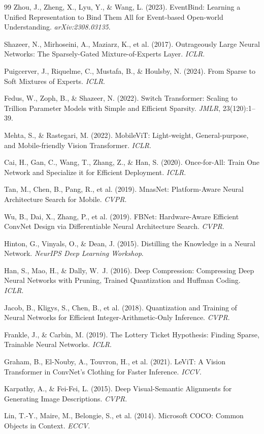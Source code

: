 \documentclass{article}
\begin{document}
{\begin{thebibliography}{99}
Zhou, J., Zheng, X., Lyu, Y., \& Wang, L. (2023). EventBind: Learning a Unified Representation to Bind Them All for Event-based Open-world Understanding. \emph{arXiv:2308.03135}.

Shazeer, N., Mirhoseini, A., Maziarz, K., et al. (2017). Outrageously Large Neural Networks: The Sparsely-Gated Mixture-of-Experts Layer. \emph{ICLR}.

Puigcerver, J., Riquelme, C., Mustafa, B., \& Houlsby, N. (2024). From Sparse to Soft Mixtures of Experts. \emph{ICLR}.

Fedus, W., Zoph, B., \& Shazeer, N. (2022). Switch Transformer: Scaling to Trillion Parameter Models with Simple and Efficient Sparsity. \emph{JMLR}, 23(120):1--39.

Mehta, S., \& Rastegari, M. (2022). MobileViT: Light-weight, General-purpose, and Mobile-friendly Vision Transformer. \emph{ICLR}.

Cai, H., Gan, C., Wang, T., Zhang, Z., \& Han, S. (2020). Once-for-All: Train One Network and Specialize it for Efficient Deployment. \emph{ICLR}.

Tan, M., Chen, B., Pang, R., et al. (2019). MnasNet: Platform-Aware Neural Architecture Search for Mobile. \emph{CVPR}.

Wu, B., Dai, X., Zhang, P., et al. (2019). FBNet: Hardware-Aware Efficient ConvNet Design via Differentiable Neural Architecture Search. \emph{CVPR}.

Hinton, G., Vinyals, O., \& Dean, J. (2015). Distilling the Knowledge in a Neural Network. \emph{NeurIPS Deep Learning Workshop}.

Han, S., Mao, H., \& Dally, W.~J. (2016). Deep Compression: Compressing Deep Neural Networks with Pruning, Trained Quantization and Huffman Coding. \emph{ICLR}.

Jacob, B., Kligys, S., Chen, B., et al. (2018). Quantization and Training of Neural Networks for Efficient Integer-Arithmetic-Only Inference. \emph{CVPR}.

Frankle, J., \& Carbin, M. (2019). The Lottery Ticket Hypothesis: Finding Sparse, Trainable Neural Networks. \emph{ICLR}.

Graham, B., El-Nouby, A., Touvron, H., et al. (2021). LeViT: A Vision Transformer in ConvNet's Clothing for Faster Inference. \emph{ICCV}.

Karpathy, A., \& Fei-Fei, L. (2015). Deep Visual-Semantic Alignments for Generating Image Descriptions. \emph{CVPR}.

Lin, T.-Y., Maire, M., Belongie, S., et al. (2014). Microsoft COCO: Common Objects in Context. \emph{ECCV}.

\end{thebibliography}
}
\end{document}
